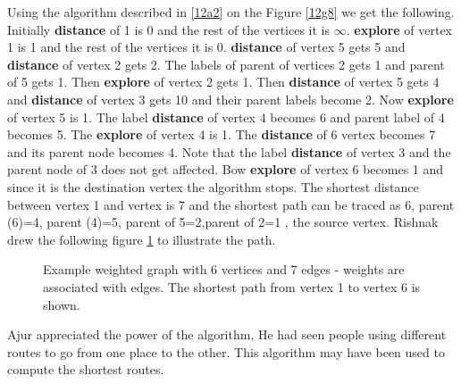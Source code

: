 Using the algorithm described in \ref{12a2} on the Figure \ref{12g8} we get the following.
Initially \textbf{distance} of 1 is 0 and the rest of the vertices it is $\infty$. \textbf{explore} of vertex 1 is 1 and the rest of the vertices it is 0. \textbf{distance} of vertex 5 gets 5 and \textbf{distance} of vertex 2 gets 2. The labels of parent of vertices 2 gets 1 and parent of 5 gets 1. Then \textbf{explore} of vertex 2 gets 1. Then \textbf{distance} of vertex 5 gets 4 and \textbf{distance} of vertex 3 gets 10 and their parent labels become 2. Now \textbf{explore} of vertex 5 is 1. The label \textbf{distance} of vertex 4 becomes 6 and parent label of 4 becomes 5. The \textbf{explore} of vertex 4 is 1. The \textbf{distance} of 6 vertex becomes 7 and its parent node becomes 4. Note that the label \textbf{distance} of vertex 3 and the parent node of 3 does not get affected. Bow \textbf{explore} of vertex 6 becomes 1 and since it is the destination vertex the algorithm stops. The shortest distance between vertex 1 and vertex is 7 and the shortest path can be traced as 6, parent (6)=4, parent (4)=5, parent of 5=2,parent of 2=1 , the source vertex.
Rishnak drew the following figure \ref{12g9} to illustrate the path.

\begin{figure}
\begin{center}
\caption{ Example weighted graph with 6 vertices and 7 edges - weights are associated with edges. The shortest path from vertex 1 to vertex 6 is shown.}\label{12g9}
\end{center}
\end{figure}

Ajur appreciated the power of the algorithm, He had seen people using different routes to go from one place to the other. This algorithm may have been used to compute the shortest routes. 

